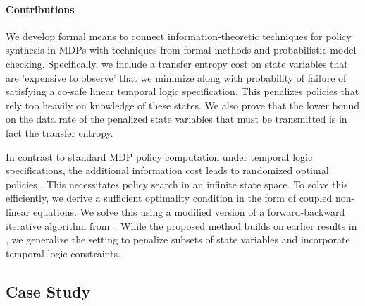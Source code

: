 \paragraph*{\textbf{Contributions}} We develop formal means to connect information-theoretic techniques for policy synthesis in MDPs with techniques from formal methods and probabilistic model checking. Specifically, we include a transfer entropy cost on state variables that are 'expensive to observe' that we  minimize along with probability of failure of satisfying a co-safe linear temporal logic specification. This penalizes policies that rely too heavily on knowledge of these states. We also prove that the lower bound on the data rate of the penalized state variables that must be transmitted is in fact the transfer entropy.



In contrast to standard MDP policy computation under temporal logic specifications, the additional information cost leads to randomized optimal policies \cite{tanaka2017lqg,Todorov09,takashi17}. This necessitates policy search in an infinite state space. To solve this efficiently, we derive a sufficient optimality condition in the form of coupled non-linear equations. We solve this using a modified version of a forward-backward iterative algorithm from~\cite{Blahut72}. While the proposed method builds on earlier results in \cite{takashi17}, we generalize the setting to penalize subsets of state variables and incorporate temporal logic constraints. 

\subsection{Case Study}\label{sec:casestudy}



